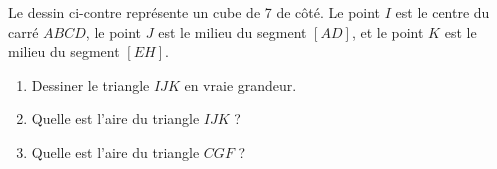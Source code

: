 
\begin{exercice}\label{exoSeconde-0095}

    \begin{multicols}{2}

        Le dessin ci-contre représente un cube de \unit{7}{\centi\meter} de côté. Le point \( I\) est le centre du carré \( ABCD\), le point \( J\) est le milieu du segment \( [AD]\), et le point \( K\) est le milieu du segment \( [EH]\).

        \begin{enumerate}
    \item
        Dessiner le triangle \( IJK\) en vraie grandeur.
            \item
        Quelle est l'aire du triangle \( IJK\) ?
    \item
    Quelle est l'aire du triangle \( CGF\) ?
        \end{enumerate}

        \columnbreak

        \begin{center}

        \end{center}

    \end{multicols}
    

\end{exercice}
